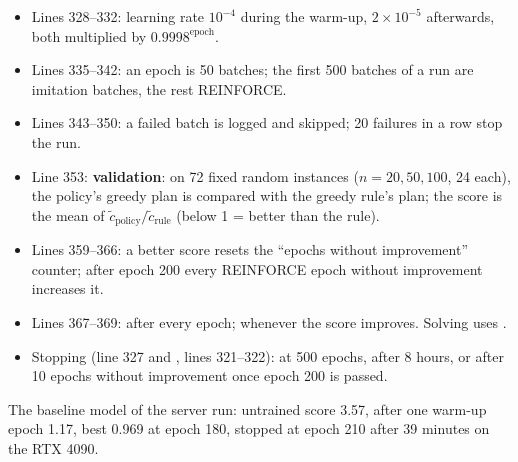 \begin{itemize}
  \item Lines 328--332: learning rate $10^{-4}$ during the warm-up, $2\times10^{-5}$ afterwards, both multiplied by $0.9998^{\text{epoch}}$.
  \item Lines 335--342: an epoch is 50 batches; the first 500 batches of a run are imitation batches, the rest REINFORCE.
  \item Lines 343--350: a failed batch is logged and skipped; 20 failures in a row stop the run.
  \item Line 353: \textbf{validation}: on 72 fixed random instances ($n=20,50,100$, 24 each), the policy's greedy plan is compared with the greedy rule's plan; the score is the mean of $\tilde c_{\text{policy}}/\tilde c_{\text{rule}}$ (below 1 = better than the rule).
  \item Lines 359--366: a better score resets the ``epochs without improvement'' counter; after epoch 200 every REINFORCE epoch without improvement increases it.
  \item Lines 367--369:  after every epoch;  whenever the score improves. Solving uses .
  \item Stopping (line 327 and , lines 321--322): at 500 epochs, after 8 hours, or after 10 epochs without improvement once epoch 200 is passed.
\end{itemize}
The baseline model of the server run: untrained score 3.57, after one warm-up epoch 1.17, best 0.969 at epoch 180, stopped at epoch 210 after 39 minutes on the RTX 4090.

